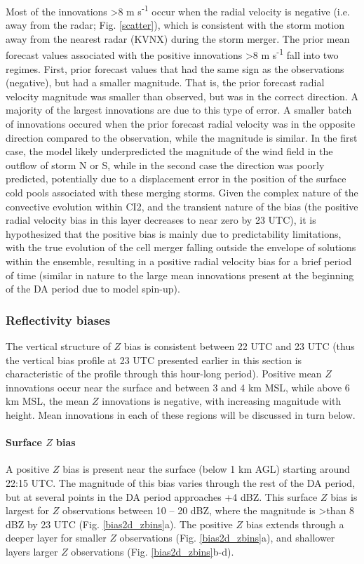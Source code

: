 Most of the innovations \textgreater 8 m s\textsuperscript{-1} occur when the radial velocity is negative (i.e. away from the radar; Fig. \ref{scatter}), which is consistent with the storm motion away from the nearest radar (KVNX) during the storm merger. The prior mean forecast values associated with the positive innovations \textgreater 8 m s\textsuperscript{-1} fall into two regimes. First, prior forecast values that had the same sign as the observations (negative), but had a smaller magnitude. That is, the prior forecast radial velocity magnitude was smaller than observed, but was in the correct direction. A majority of the largest innovations are due to this type of error. A smaller batch of innovations occured when the prior forecast radial velocity was in the opposite direction compared to the observation, while the magnitude is similar. In the first case, the model likely underpredicted the magnitude of the wind field in the outflow of storm N or S, while in the second case the direction was poorly predicted, potentially due to a displacement error in the position of the surface cold pools associated with these merging storms. Given the complex nature of the convective evolution within CI2, and the transient nature of the bias (the positive radial velocity bias in this layer decreases to near zero by 23 UTC), it is hypothesized that the positive bias is mainly due to predictability limitations, with the true evolution of the cell merger falling outside the envelope of solutions within the ensemble, resulting in a positive radial velocity bias for a brief period of time (similar in nature to the large mean innovations present at the beginning of the DA period due to model spin-up).

\subsubsection{Reflectivity biases}
The vertical structure of \(Z\) bias is consistent between 22 UTC and 23 UTC (thus the vertical bias profile at 23 UTC presented earlier in this section is characteristic of the profile through this hour-long period). Positive mean \(Z\) innovations occur near the surface and between 3 and 4 km MSL, while above 6 km MSL, the mean \(Z\) innovations is negative, with increasing magnitude with height. Mean innovations in each of these regions will be discussed in turn below.

\paragraph{Surface \(Z\) bias}
A positive \(Z\) bias is present near the surface (below 1 km AGL) starting around 22:15 UTC. The magnitude of this bias varies through the rest of the DA period, but at several points in the DA period approaches +4 dBZ. This surface \(Z\) bias is largest for \(Z\) observations between 10 -- 20 dBZ, where the magnitude is \textgreater than 8 dBZ by 23 UTC (Fig. \ref{bias2d_zbins}a). The positive \(Z\) bias extends through a deeper layer for smaller \(Z\) observations (Fig. \ref{bias2d_zbins}a), and shallower layers larger \(Z\) observations (Fig. \ref{bias2d_zbins}b-d).

